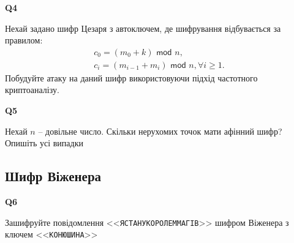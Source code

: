 \documentclass{../../test-template}
\begin{document}
\begin{tcolorbox}[lowerbox=invisible,colback=white]
    \begin{minipage}{0.1\textwidth}
        \raggedright
        \vspace*{\fill}
            \textbf{Q4}
        \vspace*{\fill}
        \end{minipage}
        \begin{minipage}{0.75\textwidth}
            Нехай задано шифр Цезаря з автоключем, де шифрування відбувається за правилом:
            \begin{gather*}
            c_0=(m_0+k)\textsf{ mod }n,\\
        c_i=(m_{i-1}+m_i)\textsf{ mod } n, \forall i\geq1.
            \end{gather*}
            Побудуйте атаку на даний шифр використовуючи підхід частотного криптоаналізу.
        \end{minipage}
\end{tcolorbox}

\begin{tcolorbox}[lowerbox=invisible,colback=white]
    \begin{minipage}{0.1\textwidth}
        \raggedright
        \vspace*{\fill}
            \textbf{Q5}
        \vspace*{\fill}
        \end{minipage}
        \begin{minipage}{0.75\textwidth}
            Нехай $n$ -- довільне число. Скільки нерухомих точок мати афінний шифр? Опишіть усі випадки
        \end{minipage}
\end{tcolorbox}


\subsection{Шифр Віженера}

\begin{tcolorbox}[lowerbox=invisible,colback=white]
    \begin{minipage}{0.1\textwidth}
        \raggedright
        \vspace*{\fill}
            \textbf{Q6}
        \vspace*{\fill}
        \end{minipage}
        \begin{minipage}{0.75\textwidth}
            Зашифруйте повідомлення <<\texttt{ЯСТАНУКОРОЛЕММАГIВ}>> шифром Віженера з ключем <<\texttt{КОНЮШИНА}>>
        \end{minipage}
\end{tcolorbox}
\end{document}
